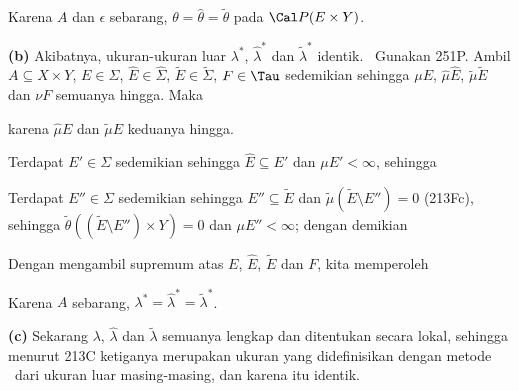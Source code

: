 { Karena $A$ dan $\epsilon$ sebarang,
$\theta=\hat\theta=\tilde\theta$ pada $\Cal P(E\times Y)$.\ \Qed

\medskip

{\bf (b)} Akibatnya, ukuran-ukuran luar $\lambda^*$, $\hat\lambda^*$
dan $\tilde\lambda^*$ identik. \Prf\ Gunakan 251P. Ambil
$A\subseteq X\times Y$, $E\in\Sigma$, $\hat E\in\hat\Sigma$,
$\tilde E\in\tilde\Sigma$,
$F\in\Tau$ sedemikian sehingga $\mu E$, $\hat\mu\hat E$, $\tilde\mu\tilde E$ dan
$\nu F$ semuanya hingga. Maka

\medskip



\noindent karena $\hat\mu E$ dan $\tilde\mu E$ keduanya hingga.

\medskip

 Terdapat $E'\in\Sigma$ sedemikian sehingga $\hat E\subseteq E'$
dan $\mu E'<\infty$, sehingga


\medskip

 Terdapat $E''\in\Sigma$ sedemikian sehingga
$E''\subseteq\tilde E$ dan $\tilde\mu(\tilde E\setminus E'')=0$ (213Fc),
sehingga
$\tilde\theta((\tilde E\setminus E'')\times Y)=0$ dan $\mu E''<\infty$;
dengan demikian


\medskip

 Dengan mengambil supremum atas $E$, $\hat E$, $\tilde E$ dan
$F$,
kita memperoleh


\noindent Karena $A$ sebarang,
$\lambda^*=\hat\lambda^*=\tilde\lambda^*$.\ \Qed

\medskip

{\bf (c)} Sekarang $\lambda$, $\hat\lambda$ dan $\tilde\lambda$ semuanya
lengkap dan ditentukan secara lokal, sehingga menurut 213C ketiganya merupakan ukuran
yang didefinisikan dengan metode
\Caratheodory\ dari ukuran luar masing-masing, dan karena itu identik.
}%

